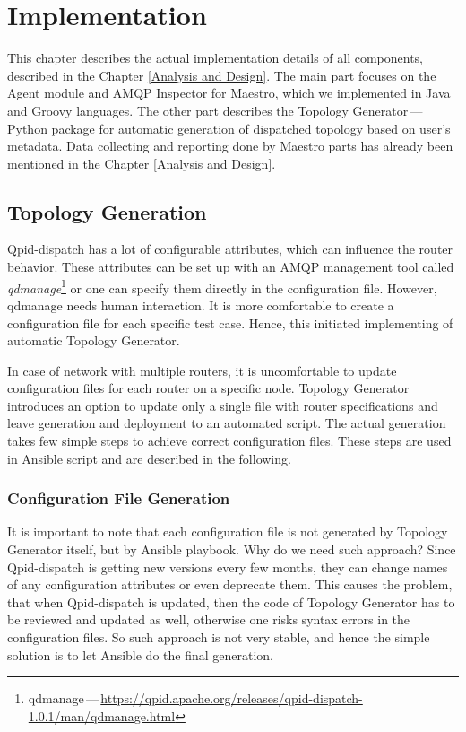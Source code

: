 \chapter{Implementation}
\label{Implementation}
This chapter describes the actual implementation details of all components, described in the Chapter \ref{Analysis and Design}. The main part focuses on the Agent module and AMQP Inspector for Maestro, which we implemented in Java and Groovy languages. The other part describes the Topology Generator\,---\,Python package for automatic generation of dispatched topology based on user's metadata. Data collecting and reporting done by Maestro parts has already been mentioned in the Chapter \ref{Analysis and Design}.

\section{Topology Generation}
Qpid-dispatch has a lot of configurable attributes, which can influence the router behavior. These attributes can be set up with an AMQP management tool called \emph{qdmanage}\footnote{qdmanage\,---\,\url{https://qpid.apache.org/releases/qpid-dispatch-1.0.1/man/qdmanage.html}} or one can specify them directly in the configuration file. However, qdmanage needs human interaction. It is more comfortable to create a configuration file for each specific test case. Hence, this initiated implementing of automatic Topology Generator.

In case of network with multiple routers, it is uncomfortable to update configuration files for each router on a specific node. Topology Generator introduces an option to update only a single file with router specifications and leave generation and deployment to an automated script. The actual generation takes few simple steps to achieve correct configuration files. These steps are used in Ansible script and are described in the following.

\subsection{Configuration File Generation}
It is important to note that each configuration file is not generated by Topology Generator itself, but by Ansible playbook. Why do we need such approach? Since Qpid-dispatch is getting new versions every few months, they can change names of any configuration attributes or even deprecate them. This causes the problem, that when Qpid-dispatch is updated, then the code of Topology Generator has to be reviewed and updated as well, otherwise one risks syntax errors in the configuration files. So such approach is not very stable, and hence the simple solution is to let Ansible do the final generation.

